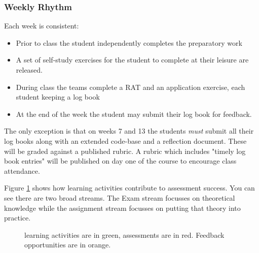\documentclass[twoside=false,DIV=14]{scrartcl}
\begin{document}
\subsubsection*{Weekly Rhythm}
Each week is consistent:
\begin{itemize}
\item Prior to class the student independently completes the preparatory work
\item A set of self-study exercises for the student to complete at their leisure are released.
\item During class the teams complete a RAT and an application exercise, each student keeping a log book
\item At the end of the week the student may submit their log book for feedback.
\end{itemize}
The only exception is that on weeks 7 and 13 the students \emph{must} submit all their log books along with an extended code-base and a reflection document.  These will be graded against a published rubric.  A rubric which includes "timely log book entries" will be published on day one of the course to encourage class attendance.

Figure \ref{fig:activities} shows how learning activities contribute to assessment success.  You can see there are two broad streams.  The Exam stream focusses on theoretical knowledge while the assignment stream focusses on putting that theory into practice.
\usetikzlibrary{fit}
\begin{figure}
\caption{learning activities are in green, assessments are in red.  Feedback opportunities are in orange.}
\label{fig:activities}
\end{figure}
\end{document}
